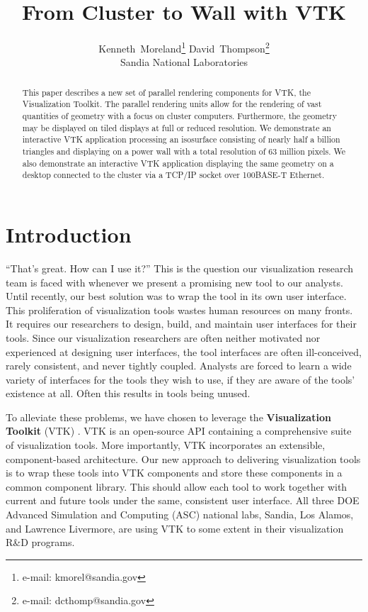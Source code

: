 \documentclass{acmsiggraph}
\title{From Cluster to Wall with VTK}
\author{Kenneth~Moreland\thanks{e-mail: kmorel@sandia.gov} \hspace{.2in}
  David~Thompson\thanks{e-mail: dcthomp@sandia.gov}
  \\ Sandia National Laboratories}
\newcommand{\keyterm}[1]{\textbf{#1}}
\begin{document}
  \maketitle

  \begin{abstract}
    This paper describes a new set of parallel rendering components for
    VTK, the Visualization Toolkit.  The parallel rendering units allow for
    the rendering of vast quantities of geometry with a focus on cluster
    computers.  Furthermore, the geometry may be displayed on tiled
    displays at full or reduced resolution.  We demonstrate an interactive
    VTK application processing an isosurface consisting of nearly half a
    billion triangles and displaying on a power wall with a total
    resolution of 63 million pixels.  We also demonstrate an interactive
    VTK application displaying the same geometry on a desktop connected to
    the cluster via a TCP/IP socket over 100BASE-T Ethernet.
  \end{abstract}

  \begin{CRcatlist}
  \end{CRcatlist}

  \keywordlist

  \copyrightspace

  \section{Introduction}
  \label{sec:introduction}

  ``That's great.  How can I use it?''  This is the question our
  visualization research team is faced with whenever we present a promising
  new tool to our analysts.  Until recently, our best solution was to wrap
  the tool in its own user interface.  This proliferation of visualization
  tools wastes human resources on many fronts.  It requires our researchers
  to design, build, and maintain user interfaces for their tools.  Since
  our visualization researchers are often neither motivated nor experienced
  at designing user interfaces, the tool interfaces are often
  ill-conceived, rarely consistent, and never tightly coupled.  Analysts
  are forced to learn a wide variety of interfaces for the tools they wish
  to use, if they are aware of the tools' existence at all.  Often this
  results in tools being unused.

  To alleviate these problems, we have chosen to leverage the
  \keyterm{Visualization Toolkit} (VTK) \cite{Schroeder02}.  VTK is an
  open-source API containing a comprehensive suite of visualization tools.
  More importantly, VTK incorporates an extensible, component-based
  architecture.  Our new approach to delivering visualization tools is to
  wrap these tools into VTK components and store these components in a
  common component library.  This should allow each tool to work together
  with current and future tools under the same, consistent user interface.
  All three DOE Advanced Simulation and Computing (ASC) national labs,
  Sandia, Los Alamos, and Lawrence Livermore, are using VTK to some extent
  in their visualization R\&D programs.
\end{document}
